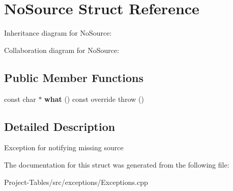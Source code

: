 \hypertarget{structNoSource}{}\section{No\+Source Struct Reference}
\label{structNoSource}


Inheritance diagram for No\+Source\+:


Collaboration diagram for No\+Source\+:
\subsection*{Public Member Functions}
\begin{DoxyCompactItemize}
\item 
\mbox{\label{structNoSource_a36d5a099434ca34779849c36f7524e56}} 
const char $\ast$ {\bfseries what} () const override  throw ()
\end{DoxyCompactItemize}


\subsection{Detailed Description}
Exception for notifying missing source 

The documentation for this struct was generated from the following file\+:\begin{DoxyCompactItemize}
\item 
Project-\/\+Tables/src/exceptions/Exceptions.\+cpp\end{DoxyCompactItemize}
